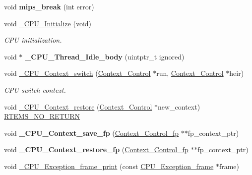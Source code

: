 \begin{DoxyCompactItemize}
void {\bfseries mips\+\_\+break} (int error)
\item 
void \mbox{\hyperlink{group__RTEMSScoreCPUMIPS_ga869484e3d851b032fd826c69ff21fc72}{\+\_\+\+C\+P\+U\+\_\+\+Initialize}} (void)
\begin{DoxyCompactList}\small\item\em C\+PU initialization. \end{DoxyCompactList}\item 
\mbox{\label{group__RTEMSScoreCPUMIPS_ga903a802003c95d6ef5206cb330424a1b}} 
void $\ast$ {\bfseries \+\_\+\+C\+P\+U\+\_\+\+Thread\+\_\+\+Idle\+\_\+body} (uintptr\+\_\+t ignored)
\item 
void \mbox{\hyperlink{group__RTEMSScoreCPUMIPS_gaa9f8cc989454b28232e5375e30c90970}{\+\_\+\+C\+P\+U\+\_\+\+Context\+\_\+switch}} (\mbox{\hyperlink{structContext__Control}{Context\+\_\+\+Control}} $\ast$run, \mbox{\hyperlink{structContext__Control}{Context\+\_\+\+Control}} $\ast$heir)
\begin{DoxyCompactList}\small\item\em C\+PU switch context. \end{DoxyCompactList}\item 
void \mbox{\hyperlink{group__RTEMSScoreCPUMIPS_ga80726ebfe00f31a88b086cc4474c472f}{\+\_\+\+C\+P\+U\+\_\+\+Context\+\_\+restore}} (\mbox{\hyperlink{structContext__Control}{Context\+\_\+\+Control}} $\ast$new\+\_\+context) \mbox{\hyperlink{group__RTEMSScoreBaseDefs_gaa2f0ed67aa174f684bb31b7e8bdb386f}{R\+T\+E\+M\+S\+\_\+\+N\+O\+\_\+\+R\+E\+T\+U\+RN}}
\item 
\mbox{\label{group__RTEMSScoreCPUMIPS_ga14068cf644755c5f95495fc937e4c5d9}} 
void {\bfseries \+\_\+\+C\+P\+U\+\_\+\+Context\+\_\+save\+\_\+fp} (\mbox{\hyperlink{structContext__Control__fp}{Context\+\_\+\+Control\+\_\+fp}} $\ast$$\ast$fp\+\_\+context\+\_\+ptr)
\item 
\mbox{\label{group__RTEMSScoreCPUMIPS_ga57b3171c5692c9a1db94c2ad941ee22d}} 
void {\bfseries \+\_\+\+C\+P\+U\+\_\+\+Context\+\_\+restore\+\_\+fp} (\mbox{\hyperlink{structContext__Control__fp}{Context\+\_\+\+Control\+\_\+fp}} $\ast$$\ast$fp\+\_\+context\+\_\+ptr)
\item 
void \mbox{\hyperlink{group__RTEMSScoreCPUMIPS_gaa34a35de496258577c1454ba1ee07ce0}{\+\_\+\+C\+P\+U\+\_\+\+Exception\+\_\+frame\+\_\+print}} (const \mbox{\hyperlink{structCPU__Exception__frame}{C\+P\+U\+\_\+\+Exception\+\_\+frame}} $\ast$frame)

\end{DoxyCompactItemize}

